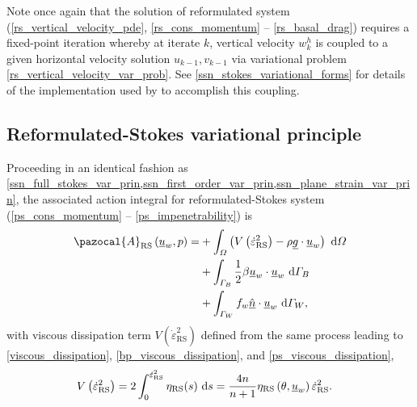 Note once again that the solution of reformulated system (\cref{rs_vertical_velocity_pde}, \cref{rs_cons_momentum} -- \cref{rs_basal_drag}) requires a fixed-point iteration whereby at iterate $k$, vertical velocity $w_k^h$ is coupled to a given horizontal velocity solution $u_{k-1},v_{k-1}$ via variational problem \cref{rs_vertical_velocity_var_prob}.  See \cref{ssn_stokes_variational_forms} for details of the implementation used by \CSLVR to accomplish this coupling.

\subsection{Reformulated-Stokes variational principle} \label{ssn_reformulated_stokes_var_prin}

Proceeding in an identical fashion as \cref{ssn_full_stokes_var_prin,ssn_first_order_var_prin,ssn_plane_strain_var_prin}, the associated action integral for reformulated-Stokes system (\cref{ps_cons_momentum} -- \cref{ps_impenetrability}) is
\begin{align}
  \label{rs_action_intermediate}
  \pazocal{A}_{\text{RS}} \left(\rankone{u}_w, p\right) = &+ \int_{\Omega} \left( V\left( \dot{\varepsilon}_{\text{RS}}^2 \right) - \rho \rankone{g} \cdot \rankone{u}_w \right) \d{\Omega} \notag \\
  &+ \int_{\Gamma_B} \frac{1}{2} \beta \rankone{u}_w \cdot \rankone{u}_w \d{\Gamma_B} \notag \\
  &+ \int_{\Gamma_W} f_w \normal \cdot \rankone{u}_w \d{\Gamma_W},
\end{align}
with viscous dissipation term $V\left( \dot{\varepsilon}_{\text{RS}}^2 \right)$ defined from the same process leading to \cref{viscous_dissipation}, \cref{bp_viscous_dissipation}, and \cref{ps_viscous_dissipation}, 
\begin{align}
  \label{rs_viscous_dissipation}
  V\left( \dot{\varepsilon}_{\text{RS}}^2 \right) &= 2\int_0^{\dot{\varepsilon}_{\text{RS}}^2} \eta_{\text{RS}}(s) \ \mathrm{d}s = \frac{4n}{n+1} \eta_{\text{RS}}\left(\theta, \underline{u}_w \right) \dot{\varepsilon}_{\text{RS}}^2.
\end{align}

